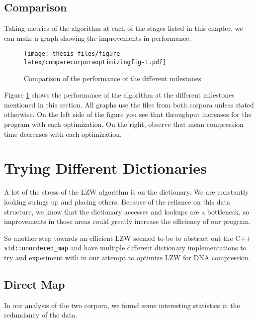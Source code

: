 \documentclass[12pt,twoside]{reedthesis}
\begin{document}
\hypertarget{comparison}{%
\subsection{Comparison}\label{comparison}}

Taking metrics of the algorithm at each of the stages listed in this chapter, we can make a graph showing the improvements in performance.
\begin{figure}
\centering
\texttt{[image: thesis\_files/figure-latex/comparecorporaoptimizingfig-1.pdf]}
\caption{\label{fig:comparecorporaoptimizingfig}Comparison of the performance of the different milestones}
\end{figure}
Figure \ref{fig:comparecorporaoptimizingfig} shows the performance of the algorithm at the different milestones mentioned in this section. All graphs use the files from both corpora unless stated otherwise. On the left side of the figure you see that throughput increases for the program with each optimization. On the right, observe that mean compression time decreases with each optimization.

\hypertarget{trying-different-dictionaries}{%
\section{Trying Different Dictionaries}\label{trying-different-dictionaries}}

A lot of the stress of the LZW algorithm is on the dictionary. We are constantly looking strings up and placing others. Because of the reliance on this data structure, we know that the dictionary accesses and lookups are a bottleneck, so improvements in those areas could greatly increase the efficiency of our program.

So another step towards an efficient LZW seemed to be to abstract out the C++ \texttt{std::unordered\_map} and have multiple different dictionary implementations to try and experiment with in our attempt to optimize LZW for DNA compression.

\hypertarget{direct-map}{%
\subsection{Direct Map}\label{direct-map}}

In our analysis of the two corpora, we found some interesting statistics in the redundancy of the data.
\end{document}
